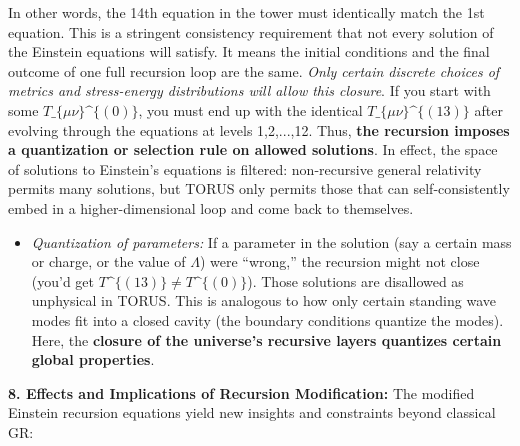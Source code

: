 \documentclass[]{article}
\begin{document}
In other words, the 14th equation in the tower must identically match
the 1st equation. This is a stringent consistency requirement that not
every solution of the Einstein equations will satisfy. It means the
initial conditions and the final outcome of one full recursion loop are
the same. \emph{Only certain discrete choices of metrics and
stress-energy distributions will allow this closure}. If you start with
some $T\_\{\mu\nu\}\^{}\{(0)\}$, you
must end up with the identical
$T\_\{\mu\nu\}\^{}\{(13)\}$ after
evolving through the equations at levels 1,2,...,12. Thus, \textbf{the
recursion imposes a quantization or selection rule on allowed
solutions}​. In effect, the space of solutions to Einstein's equations
is filtered: non-recursive general relativity permits many solutions,
but TORUS only permits those that can self-consistently embed in a
higher-dimensional loop and come back to themselves.

\begin{itemize}
\item
  \emph{Quantization of parameters:} If a parameter in the solution (say
  a certain mass or charge, or the value of $\Lambda$)
  were ``wrong,'' the recursion might not close (you'd get
  $T\^{}\{(13)\} \neq T\^{}\{(0)\}$). Those solutions
  are disallowed as unphysical in TORUS. This is analogous to how only
  certain standing wave modes fit into a closed cavity (the boundary
  conditions quantize the modes). Here, the \textbf{closure of the
  universe's recursive layers quantizes certain global properties}.
\end{itemize}

\textbf{8. Effects and Implications of Recursion Modification:} The
modified Einstein recursion equations yield new insights and constraints
beyond classical GR:
\end{document}
